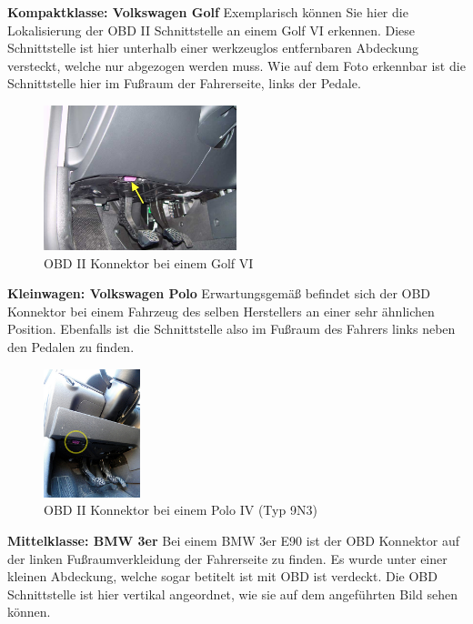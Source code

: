 \textbf{Kompaktklasse: Volkswagen Golf}
Exemplarisch können Sie hier die Lokalisierung der OBD II Schnittstelle an einem Golf VI erkennen. Diese Schnittstelle ist hier unterhalb einer werkzeuglos entfernbaren Abdeckung versteckt, welche nur abgezogen werden muss. Wie auf dem Foto erkennbar ist die Schnittstelle hier im Fußraum der Fahrerseite, links der Pedale. 

\begin{figure}[!htb]\centering
	\includegraphics[width=0.5\textwidth]{images/golfobd}
	\caption{OBD II Konnektor bei einem Golf VI \cite{Golf.OBD}}\label{Fig:Data3}
\end{figure}

\textbf{Kleinwagen: Volkswagen Polo}
Erwartungsgemäß befindet sich der OBD Konnektor bei einem Fahrzeug des selben Herstellers an einer sehr ähnlichen Position. Ebenfalls ist die Schnittstelle also im Fußraum des Fahrers links neben den Pedalen zu finden.

\begin{figure}[!htb]\centering
	\includegraphics[width=0.25\textwidth]{images/poloobd}
	\caption{OBD II Konnektor bei einem Polo IV (Typ 9N3) \cite{Polo.OBD}}\label{Fig:Data3}
\end{figure}

\textbf{Mittelklasse: BMW 3er}
Bei einem BMW 3er E90 ist der OBD Konnektor auf der linken Fußraumverkleidung der Fahrerseite zu finden. Es wurde unter einer kleinen Abdeckung, welche sogar betitelt ist mit OBD ist verdeckt. Die OBD Schnittstelle ist hier vertikal angeordnet, wie sie auf dem angeführten Bild sehen können.

